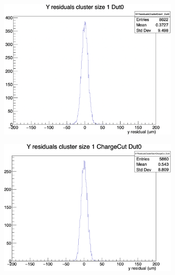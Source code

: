 \begin{figure}[H]
    \begin{subfigure}[b]{0.3\textwidth}
        \includegraphics[width=\textwidth]{images/YRes_size1_13planes.png}
        \caption{}
    \end{subfigure}
    \hfill
    \begin{subfigure}[b]{0.33\textwidth}
        \includegraphics[width=\textwidth]{images/YRes_size1_4pixel.png}
        \caption{}
    \end{subfigure}
    \hfill
    \begin{subfigure}[b]{0.3\textwidth}

\end{subfigure}
\end{figure}
